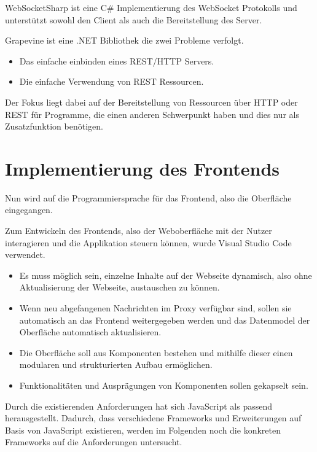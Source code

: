     WebSocketSharp ist eine C\# Implementierung des WebSocket Protokolls und unterstützt sowohl den Client als auch die Bereitstellung des Server.
    
    Grapevine ist eine .NET Bibliothek die zwei Probleme verfolgt.
    \begin{itemize}
        \item Das einfache einbinden eines REST/HTTP Servers.
        \item Die einfache Verwendung von REST Ressourcen.
    \end{itemize}
    Der Fokus liegt dabei auf der Bereitstellung von Ressourcen über HTTP oder REST für Programme, die einen anderen Schwerpunkt haben und dies nur als Zusatzfunktion benötigen.
    
\section{Implementierung des Frontends}
    
    Nun wird auf die Programmiersprache für das Frontend, also die Oberfläche eingegangen.
    
    Zum Entwickeln des Frontends, also der Weboberfläche mit der Nutzer interagieren und die Applikation steuern können, wurde Visual Studio Code \cite{microsoft_2016} verwendet.
    
    \begin{itemize}
        \item Es muss möglich sein, einzelne Inhalte auf der Webseite dynamisch, also ohne Aktualisierung der Webseite, austauschen zu können.
        \item Wenn neu abgefangenen Nachrichten im Proxy verfügbar sind, sollen sie automatisch an das Frontend weitergegeben werden und das Datenmodel der Oberfläche automatisch aktualisieren.
        \item Die Oberfläche soll aus Komponenten bestehen und mithilfe dieser einen modularen und strukturierten Aufbau ermöglichen.
        \item Funktionalitäten und Ausprägungen von Komponenten sollen gekapselt sein.
    \end{itemize}
    
    Durch die existierenden Anforderungen hat sich JavaScript als passend herausgestellt. Dadurch, dass verschiedene Frameworks und Erweiterungen auf Basis von JavaScript existieren, werden im Folgenden noch die konkreten Frameworks auf die Anforderungen untersucht.
    
